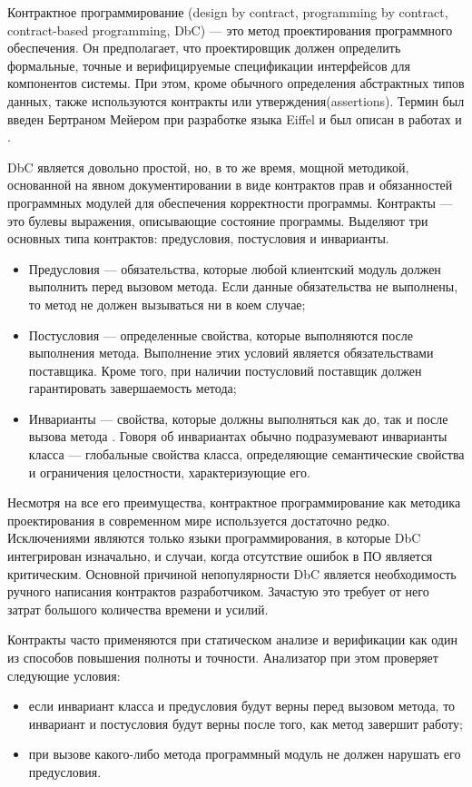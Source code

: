 Контрактное программирование (design by contract, programming by contract, contract-based programming, DbC) --- это метод проектирования программного обеспечения. Он предполагает, что проектировщик должен определить формальные, точные и верифицируемые спецификации интерфейсов для компонентов системы. При этом, кроме обычного определения абстрактных типов данных, также используются контракты или утверждения(assertions). Термин был введен Бертраном Мейером при разработке языка Eiffel\cite{eiffel} и был описан в работах \cite{designByContract} и \cite{oosc-meyer}.

DbC является довольно простой, но, в то же время, мощной методикой, основанной на явном документировании в виде контрактов прав и обязанностей программных модулей для обеспечения корректности программы. Контракты --- это булевы выражения, описывающие состояние программы. Выделяют три основных типа контрактов: предусловия, постусловия и инварианты.
\begin{itemize}
\item Предусловия --- обязательства, которые любой клиентский модуль должен выполнить перед вызовом метода. Если данные обязательства не выполнены, то метод не должен вызываться ни в коем случае;

\item Постусловия --- определенные свойства, которые выполняются после выполнения метода. Выполнение этих условий является обязательствами поставщика. Кроме того, при наличии постусловий поставщик должен гарантировать завершаемость метода;

\item Инварианты --- свойства, которые должны выполняться как до, так и после вызова метода . Говоря об инвариантах обычно подразумевают инварианты класса --- глобальные свойства класса, определяющие семантические свойства и ограничения целостности, характеризующие его.
\end{itemize}

Несмотря на все его преимущества, контрактное программирование как методика проектирования в современном мире используется достаточно редко. Исключениями являются только языки программирования, в которые DbC интегрирован изначально, и случаи, когда отсутствие ошибок в ПО является критическим. Основной причиной непопулярности DbC является необходимость ручного написания контрактов разработчиком. Зачастую это требует от него затрат большого количества времени и усилий. 

Контракты часто применяются при статическом анализе и верификации как один из способов повышения полноты и точности. Анализатор при этом проверяет следующие условия:
\begin{itemize}
\item если инвариант класса и предусловия будут верны перед вызовом метода, то инвариант и постусловия будут верны после того, как метод завершит работу;

\item при вызове какого-либо метода программный модуль не должен нарушать его предусловия.
\end{itemize}

